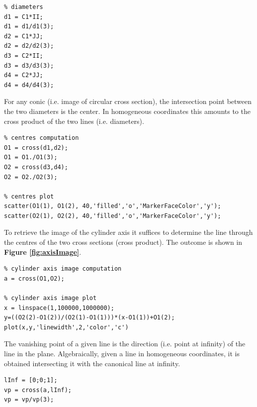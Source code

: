 \documentclass[12pt,a4paper]{article}
\begin{document}
\begin{verbatim}
% diameters
d1 = C1*II;
d1 = d1/d1(3);
d2 = C1*JJ;
d2 = d2/d2(3);
d3 = C2*II;
d3 = d3/d3(3);
d4 = C2*JJ;
d4 = d4/d4(3);
\end{verbatim}

For any conic (i.e. image of circular cross section), the intersection point between the two diameters is the center. In homogeneous coordinates this amounts to the cross product of the two lines (i.e. diameters).

\begin{verbatim}
% centres computation
O1 = cross(d1,d2);
O1 = O1./O1(3);
O2 = cross(d3,d4);
O2 = O2./O2(3);

% centres plot
scatter(O1(1), O1(2), 40,'filled','o','MarkerFaceColor','y');
scatter(O2(1), O2(2), 40,'filled','o','MarkerFaceColor','y');
\end{verbatim}

To retrieve the image of the cylinder axis it suffices to determine the line through the centres of the two cross sections (cross product). The outcome is shown in \textbf{Figure \ref{fig:axisImage}}.

\begin{verbatim}
% cylinder axis image computation
a = cross(O1,O2);

% cylinder axis image plot
x = linspace(1,100000,1000000);
y=((O2(2)-O1(2))/(O2(1)-O1(1)))*(x-O1(1))+O1(2);
plot(x,y,'linewidth',2,'color','c')
\end{verbatim}

The vanishing point of a given line is the direction (i.e. point at infinity) of the line in the plane. Algebraically, given a line in homogeneous coordinates, it is obtained intersecting it with the canonical line at infinity.

\begin{verbatim}
lInf = [0;0;1];
vp = cross(a,lInf);
vp = vp/vp(3);
\end{verbatim}
\end{document}
